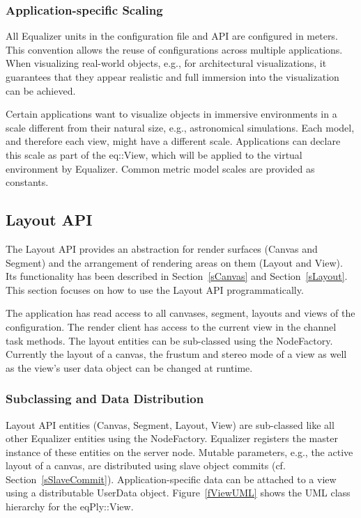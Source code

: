 \documentclass[10pt,a4]{scrartcl}
\newcommand{\fig}[1]{Figure~\ref{#1}}
\newcommand{\sref}[1]{Section~\ref{#1}}
\begin{document}
\subsubsection{\label{sScaling}Application-specific Scaling}

All Equalizer units in the configuration file and API are configured in
meters. This convention allows the reuse of configurations across multiple
applications. When visualizing real-world objects, e.g., for architectural
visualizations, it guarantees that they appear realistic and full immersion
into the visualization can be achieved. 

Certain applications want to visualize objects in immersive environments in a
scale different from their natural size, e.g., astronomical simulations. Each
model, and therefore each view, might have a different scale. Applications can
declare this scale as part of the \textsf{eq::View}, which will be applied to
the virtual environment by Equalizer. Common metric model scales are provided as
constants.

\subsection{\label{sLayoutAPI}Layout API}

The Layout API provides an abstraction for render surfaces (Canvas and
Segment) and the arrangement of rendering areas on them (Layout and
View). Its functionality has been described in \sref{sCanvas} and
\sref{sLayout}. This section focuses on how to use the Layout API
programmatically. 

The application has read access to all canvases, segment, layouts and views of
the configuration. The render client has access to the current view in the
channel task methods. The layout entities can be sub-classed using the
\textsf{NodeFactory}. Currently the layout of a canvas, the frustum and stereo
mode of a view as well as the view's user data object can be changed at runtime.


\subsubsection{Subclassing and Data Distribution}

Layout API entities (Canvas, Segment, Layout, View) are sub-classed like all
other Equalizer entities using the \textsf{NodeFactory}. Equalizer registers the
master instance of these entities on the server node. Mutable parameters, e.g.,
the active layout of a canvas, are distributed using slave object commits
(cf. \sref{sSlaveCommit}). Application-specific data can be attached to a view
using a distributable \textsf{UserData} object. \fig{fViewUML} shows the UML
class hierarchy for the \textsf{eqPly::View}.
\end{document}
